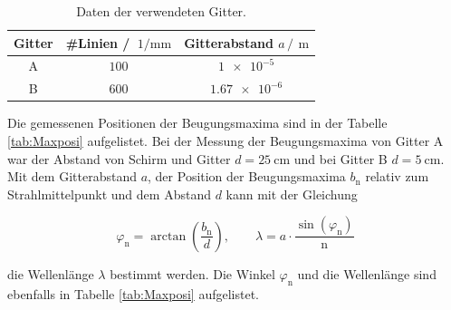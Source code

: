 \FloatBarrier
\begin{table}
  \centering
  \caption{Daten der verwendeten Gitter.}
  \label{tab:Gitterabstand}
  \begin{tabular}{c c c}
    \toprule
    Gitter&\#Linien / $\SI{}{1\per\milli\meter}$&Gitterabstand $a\,/\,\SI{}{\meter}$\\
    \midrule
    A&$\num{100}$&$\num{1e-5}$\\
    B&$\num{600}$&$\num{1.67e-6}$\\
    \bottomrule
  \end{tabular}
\end{table}
\FloatBarrier

Die gemessenen Positionen der Beugungsmaxima sind in der Tabelle \ref{tab:Maxposi} aufgelistet. Bei der Messung der 
Beugungsmaxima von Gitter A war der Abstand von Schirm und Gitter $d=\SI{25}{\centi\meter}$ und bei Gitter B $d=\SI{5}{\centi\meter}$.
Mit dem Gitterabstand $a$, der Position der Beugungsmaxima $b_{\text{n}}$ relativ zum Strahlmittelpunkt und dem Abstand $d$ kann mit der
Gleichung 

\begin{equation*}
  \varphi_{\text{n}}=\arctan{\left(\frac{b_{\text{n}}}{d}\right)},\qquad \lambda = a\cdot\frac{\sin{\left(\varphi_{\text{n}}\right)}}{\text{n}}
\end{equation*}

die Wellenlänge $\lambda$ bestimmt werden. Die Winkel $\varphi_{\text{n}}$ und die Wellenlänge sind ebenfalls in Tabelle \ref{tab:Maxposi} aufgelistet.

